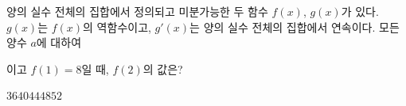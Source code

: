 양의 실수 전체의 집합에서 정의되고 미분가능한 두 함수 $f(x)$, $g(x)$가 있다. $g(x)$는 $f(x)$의 역함수이고, $g'(x)$는 양의 실수 전체의 집합에서 연속이다. 모든 양수 $a$에 대하여 \par\smallskip{}\par\smallskip\noindent 이고 $f(1)=8$일 때, $f(2)$의 값은?
\begin{choices32}{$36$}{$40$}{$44$}{$48$}{$52$}\end{choices32}
